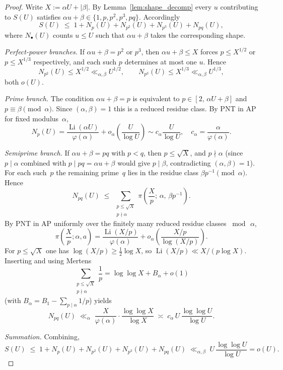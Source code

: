 \documentclass[11pt]{article}
\renewcommand{\_}{\origunderscore\allowbreak}
\theoremstyle{definition}
\theoremstyle{remark}
\begin{document}
\begin{proof}
Write $X:=\alpha U+|\beta|$.  By Lemma~\ref{lem:shape_decomp} every $u$
contributing to $S(U)$ satisfies $\alpha u+\beta\in\{1,p,p^{2},p^{3},pq\}$.
Accordingly
\[
  S(U)\;\le\;1+N_{p}(U)+N_{p^{2}}(U)+N_{p^{3}}(U)+N_{pq}(U),
\]
where $N_{\bullet}(U)$ counts $u\le U$ such that $\alpha u+\beta$
takes the corresponding shape.

\emph{Perfect-power branches.}  If $\alpha u+\beta=p^{2}$ or $p^{3}$,
then $\alpha u+\beta\le X$ forces $p\le X^{1/2}$ or $p\le X^{1/3}$
respectively, and each such $p$ determines at most one $u$.  Hence
\[
  N_{p^{2}}(U)\le X^{1/2}\ll_{\alpha,\beta}U^{1/2},
  \qquad
  N_{p^{3}}(U)\le X^{1/3}\ll_{\alpha,\beta}U^{1/3},
\]
both $o(U)$.

\emph{Prime branch.}  The condition $\alpha u+\beta=p$ is equivalent to
$p\in[2,\,\alpha U+\beta]$ and $p\equiv\beta\pmod{\alpha}$.  Since
$(\alpha,\beta)=1$ this is a reduced residue class.  By PNT in AP for
fixed modulus~$\alpha$,
\[
  N_{p}(U)=\frac{\operatorname{Li}(\alpha U)}{\varphi(\alpha)}
  +o_{\alpha}\!\left(\frac{U}{\log U}\right)
  \sim c_{\alpha}\frac{U}{\log U},
  \quad c_{\alpha}=\frac{\alpha}{\varphi(\alpha)}.
\]

\emph{Semiprime branch.}  If $\alpha u+\beta=pq$ with $p<q$, then
$p\le\sqrt{X}$, and $p\nmid\alpha$ (since $p\mid\alpha$ combined with
$p\mid pq=\alpha u+\beta$ would give $p\mid\beta$, contradicting
$(\alpha,\beta)=1$).  For each such~$p$ the remaining prime~$q$ lies
in the residue class $\beta p^{-1}\pmod{\alpha}$.  Hence
\[
  N_{pq}(U)\;\le\;\sum_{\substack{p\le\sqrt{X}\\p\nmid\alpha}}
  \pi\!\left(\frac{X}{p};\,\alpha,\,\beta p^{-1}\right).
\]
By PNT in AP uniformly over the finitely many reduced residue classes
$\bmod\,\alpha$,
\[
  \pi\!\left(\frac{X}{p};\alpha,a\right)
  =
  \frac{\operatorname{Li}(X/p)}{\varphi(\alpha)}
  +o_{\alpha}\!\left(\frac{X/p}{\log(X/p)}\right).
\]
For $p\le\sqrt{X}$ one has $\log(X/p)\ge\tfrac12\log X$, so
$\operatorname{Li}(X/p)\ll X/(p\log X)$.  Inserting and using Mertens
\[
  \sum_{\substack{p\le\sqrt{X}\\p\nmid\alpha}}\frac{1}{p}
  =\log\log X+B_{\alpha}+o(1)
\]
(with $B_{\alpha}=B_{1}-\sum_{p\mid\alpha}1/p$) yields
\[
  N_{pq}(U)\;\ll_{\alpha}\;
  \frac{X}{\varphi(\alpha)}\cdot\frac{\log\log X}{\log X}
  \;\asymp\;
  c_{\alpha}\,U\,\frac{\log\log U}{\log U}.
\]

\emph{Summation.}  Combining,
\[
  S(U)\;\le\;
  1+N_{p}(U)+N_{p^{2}}(U)+N_{p^{3}}(U)+N_{pq}(U)
  \;\ll_{\alpha,\beta}\;
  U\,\frac{\log\log U}{\log U}=o(U).
\]


\end{proof}
\end{document}
